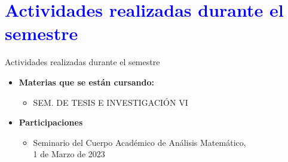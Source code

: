 \section{\textcolor{blue}{Actividades realizadas durante el semestre}}
\begin{frame}{}
    \begin{block}{}
	\centering
	\LARGE  \textcolor{Azul}{Actividades realizadas durante el semestre} 
	
\end{block}


\begin{itemize}
	\item \textbf{Materias que se están cursando:}
	\begin{itemize}
	   \item[$ \ast $] SEM. DE TESIS E INVESTIGACIÓN VI 
	\end{itemize}
	\item \textbf{Participaciones}
	\begin{itemize}
		\item[$ \ast $] 	Seminario del Cuerpo Académico de Análisis Matemático,\\ 
         1 de Marzo de 2023
	\end{itemize}
	
\end{itemize}


\end{frame}


